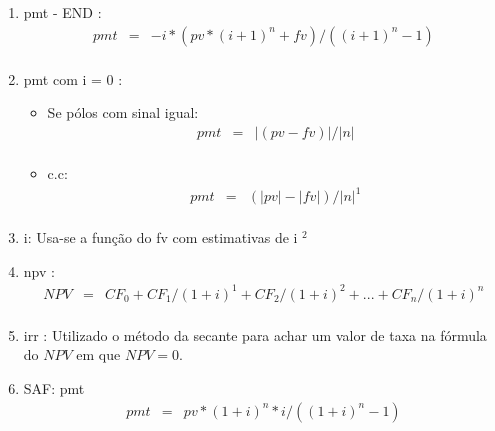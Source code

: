 \begin{enumerate}

\item  pmt - END \cite{arachnoid}:
\begin{eqnarray*}
	pmt &=& - i*( pv*(i+1)^{n} + fv ) / ((i+1)^{n} - 1) \\	
\end{eqnarray*}  
 

\item  pmt com i = 0 \cite{arachnoid2}:  

\begin{itemize}
 \item Se pólos com sinal igual:
	\begin{eqnarray*}
 		 pmt &=& |(pv - fv)| / |n| \\	
	\end{eqnarray*}
  \item c.c:
	\begin{eqnarray*}
 		pmt &=& (|pv| - |fv|) / |n|  ^{1} \\	 
	\end{eqnarray*}
\end{itemize}


\item  i: Usa-se a função do fv com estimativas de i $ ^{2} $  \cite{arachnoid2}


\item  npv \cite{man1}:
\begin{eqnarray*}
 	NPV &=& CF_{0} + CF_{1} / (1+i)^{1} + CF_{2} / (1+i)^{2} + ... + CF_{n} / (1+i)^{n} \\
\end{eqnarray*}
 

\item  irr \cite {matFinanceira2}: Utilizado o método da secante para achar um valor de taxa na fórmula do $NPV$ em que $ NPV = 0. $ 


\item SAF: pmt \cite{adail}
\begin{eqnarray*}
 	pmt &=& pv * (1+i)^{n} * i / ((1+i)^{n}-1) \\
\end{eqnarray*}
 

\end{enumerate}
